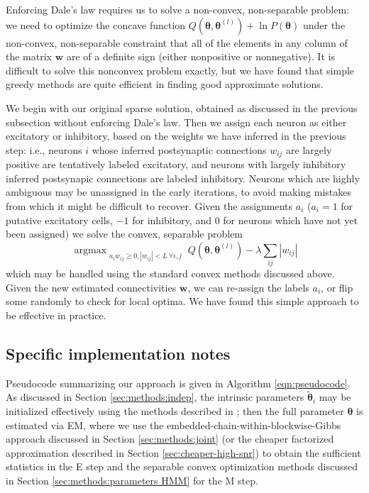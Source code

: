 \documentclass[aoas,preprint]{imsart}
\newcommand{\bth}{\mathbf{\theta}}
\newcommand{\w}{w}
\newcommand{\bw}{\mathbf{\w}}
\DeclareMathOperator*{\argmax}{argmax}
\newcommand{\tbth}{\tilde{\bth}}
\begin{document}
Enforcing Dale's law requires us to solve a non-convex, non-separable
problem: we need to optimize the concave function $Q(\bth,\bth^{(l)})
+ \ln P(\bth)$ under the non-convex, non-separable constraint that all
of the elements in any column of the matrix $\bw$ are of a definite
sign (either nonpositive or nonnegative). It is difficult to solve
this nonconvex problem exactly, but we have found that simple greedy
methods are quite efficient in finding good approximate solutions.

We begin with our original sparse solution, obtained as discussed in
the previous subsection without enforcing Dale's law. Then we assign
each neuron as either excitatory or inhibitory, based on the weights
we have inferred in the previous step: i.e., neurons $i$ whose
inferred postsynaptic connections $w_{ij}$ are largely positive are
tentatively labeled excitatory, and neurons with largely inhibitory
inferred postsynapic connections are labeled inhibitory. Neurons which
are highly ambiguous may be unassigned in the early iterations, to
avoid making mistakes from which it might be difficult to
recover. Given the assignments $a_i$ ($a_i =1$ for putative excitatory
cells, $-1$ for inhibitory, and $0$ for neurons which have not yet
been assigned) we solve the convex, separable problem \begin{equation}
\argmax_{\substack{a_i \w_{ij} \geq 0, |w_{ij}|<L ~ \forall i,j}}
Q(\bth,\bth^{(l)}) - \lambda \sum_{ij} |w_{ij}| \end{equation} which
may be handled using the standard convex methods discussed
above. Given the new estimated connectivities $\bw$, we can re-assign
the labels $a_i$, or flip some randomly to check for local optima. We
have found this simple approach to be effective in practice.


\subsection{Specific implementation notes} \label{sec:methods:specific_implementation}

Pseudocode summarizing our approach is given in Algorithm \ref{eqn:pseudocode}. As discussed in Section \ref{sec:methods:indep}, the intrinsic parameters $\tbth_i$ may be initialized effectively using the methods described in \cite{Vogelstein2009}; then the full parameter $\bth$ is estimated via EM, where we use the embedded-chain-within-blockwise-Gibbs approach discussed in Section \ref{sec:methods:joint} (or the cheaper factorized approximation described in Section \ref{sec:cheaper-high-snr}) to obtain the sufficient statistics in the E step and the separable convex optimization methods discussed in Section \ref{sec:methods:parameters HMM} for the M step.
\end{document}
